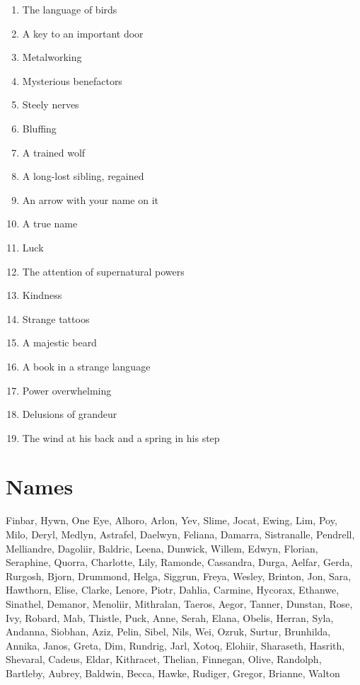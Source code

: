 \begin{enumerate}
\item The language of birds
\item A key to an important door
\item Metalworking
\item Mysterious benefactors
\item Steely nerves
\item Bluffing
\item A trained wolf
\item A long-lost sibling, regained
\item An arrow with your name on it
\item A true name
\item Luck
\item The attention of supernatural powers
\item Kindness
\item Strange tattoos
\item A majestic beard
\item A book in a strange language
\item Power overwhelming
\item Delusions of grandeur
\item The wind at his back and a spring in his step

\end{enumerate}
\section*{Names}


 Finbar, Hywn, One Eye, Alhoro, Arlon, Yev, Slime, Jocat, Ewing, Lim, Poy, Milo, Deryl, Medlyn, Astrafel, Daelwyn, Feliana, Damarra, Sistranalle, Pendrell, Melliandre, Dagoliir, Baldric, Leena, Dunwick, Willem, Edwyn, Florian, Seraphine, Quorra, Charlotte, Lily, Ramonde, Cassandra, Durga, Aelfar, Gerda, Rurgosh, Bjorn, Drummond, Helga, Siggrun, Freya, Wesley, Brinton, Jon, Sara, Hawthorn, Elise, Clarke, Lenore, Piotr, Dahlia, Carmine, Hycorax, Ethanwe, Sinathel, Demanor, Menoliir, Mithralan, Taeros, Aegor, Tanner, Dunstan, Rose, Ivy, Robard, Mab, Thistle, Puck, Anne, Serah, Elana, Obelis, Herran, Syla, Andanna, Siobhan, Aziz, Pelin, Sibel, Nils, Wei, Ozruk, Surtur, Brunhilda, Annika, Janos, Greta, Dim, Rundrig, Jarl, Xotoq, Elohiir, Sharaseth, Hasrith, Shevaral, Cadeus, Eldar, Kithracet, Thelian, Finnegan, Olive, Randolph, Bartleby, Aubrey, Baldwin, Becca, Hawke, Rudiger, Gregor, Brianne, Walton


